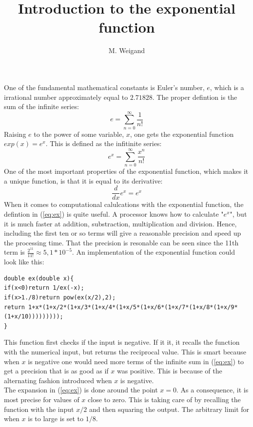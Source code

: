 \documentclass{article}
\title{Introduction to the exponential function}
\author{M. Weigand}
\date{}
\begin{document}
\maketitle
One of the fundamental mathematical constants is Euler's number, $e$, which is a irrational number approximately equal to $2.71828$. The proper defintion is the sum of the infinite series:
\begin{equation}
e=\sum_{n=0}^{\infty}\frac{1}{n!}
\end{equation} 
Raising $e$ to the power of some variable, $x$, one gets the exponential function $exp(x)=e^x$. This is defined as the infitinite series:
\begin{equation}\label{eq:ex}
e^x=\sum_{n=0}^{\infty}\frac{x^n}{n!}
\end{equation}
One of the most important properties of the exponential function, which makes it a unique function, is that it is equal to its derivative:
\begin{equation}
\frac{d}{dx}e^x=e^x
\end{equation}
When it comes to computational calulcations with the exponential function, the defintion in (\ref{eq:ex}) is quite useful. A processor knows how to calculate "$e^x$", but it is much faster at addition, substraction, multiplication and division. Hence, including the first ten or so terms will give a reasonable precision and speed up the processing time. That the precision is resonable can be seen since the 11th term is $\frac{2^{11}}{11!}\approx 5,1*10^{-5}$. An implementation of the exponential function could look like this:
\begin{lstlisting}
double ex(double x){
if(x<0)return 1/ex(-x);
if(x>1./8)return pow(ex(x/2),2);
return 1+x*(1+x/2*(1+x/3*(1+x/4*(1+x/5*(1+x/6*(1+x/7*(1+x/8*(1+x/9*(1+x/10)))))))));
}
\end{lstlisting}
This function first checks if the input is negative. If it it, it recalls the function with the numerical input, but returns the reciprocal value. This is smart because when $x$ is negative one would need more terms of the infinite sum in (\ref{eq:ex}) to get a precision that is as good as if $x$ was positive. This is because of the alternating fashion introduced when $x$ is negative.\\
The expansion in (\ref{eq:ex}) is done around the point $x=0$. As a consequence, it is most precise for values of $x$ close to zero. This is taking care of by recalling the function with the input $x/2$ and then squaring the output. The arbitrary limit for when $x$ is to large is set to $1/8$.\\
\end{document}
